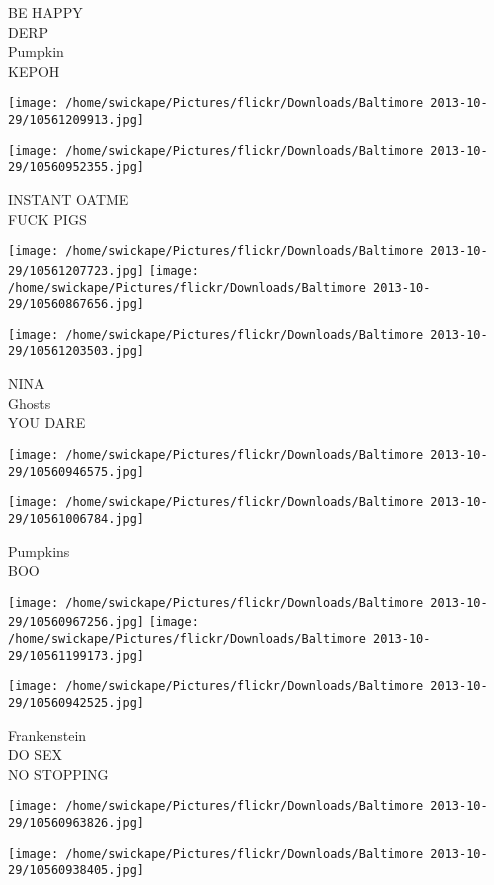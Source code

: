 \documentclass[10pt,letterpaper]{article}
\begin{document}
BE HAPPY\\
DERP\\
Pumpkin\\
KEPOH
\pagebreak

\texttt{[image: /home/swickape/Pictures/flickr/Downloads/Baltimore 2013-10-29/10561209913.jpg]}

\vspace{0.25in}
\texttt{[image: /home/swickape/Pictures/flickr/Downloads/Baltimore 2013-10-29/10560952355.jpg]}

INSTANT OATME\\
FUCK PIGS
\pagebreak

\texttt{[image: /home/swickape/Pictures/flickr/Downloads/Baltimore 2013-10-29/10561207723.jpg]}
\texttt{[image: /home/swickape/Pictures/flickr/Downloads/Baltimore 2013-10-29/10560867656.jpg]}

\texttt{[image: /home/swickape/Pictures/flickr/Downloads/Baltimore 2013-10-29/10561203503.jpg]}

NINA\\
Ghosts\\
YOU DARE
\pagebreak

\texttt{[image: /home/swickape/Pictures/flickr/Downloads/Baltimore 2013-10-29/10560946575.jpg]}

\vspace{0.25in}
\texttt{[image: /home/swickape/Pictures/flickr/Downloads/Baltimore 2013-10-29/10561006784.jpg]}

Pumpkins\\
BOO
\pagebreak

\texttt{[image: /home/swickape/Pictures/flickr/Downloads/Baltimore 2013-10-29/10560967256.jpg]}
\texttt{[image: /home/swickape/Pictures/flickr/Downloads/Baltimore 2013-10-29/10561199173.jpg]}

\texttt{[image: /home/swickape/Pictures/flickr/Downloads/Baltimore 2013-10-29/10560942525.jpg]}

Frankenstein\\
DO SEX\\
NO STOPPING
\pagebreak

\texttt{[image: /home/swickape/Pictures/flickr/Downloads/Baltimore 2013-10-29/10560963826.jpg]}

\vspace{0.25in}
\texttt{[image: /home/swickape/Pictures/flickr/Downloads/Baltimore 2013-10-29/10560938405.jpg]}
\end{document}
